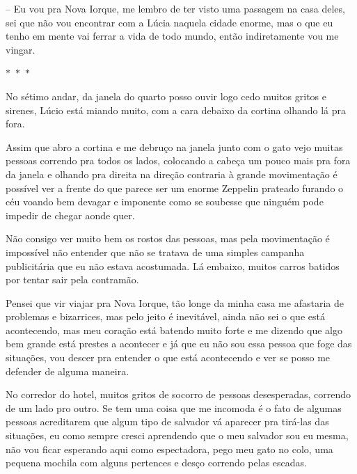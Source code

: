 -- Eu vou pra Nova Iorque, me lembro de ter visto uma passagem na casa deles, sei que não vou encontrar com a Lúcia naquela cidade enorme, mas o que eu tenho em mente vai ferrar a vida de todo mundo, então indiretamente vou me vingar.

\begin{center}
    $\ast$~$\ast$~$\ast$
\end{center}

No sétimo andar, da janela do quarto posso ouvir logo cedo muitos gritos e sirenes, Lúcio está miando muito, com a cara debaixo da cortina olhando lá pra fora.

Assim que abro a cortina e me debruço na janela junto com o gato vejo muitas pessoas correndo pra todos os lados, colocando a cabeça um pouco mais pra fora da janela e olhando pra direita na direção contraria à grande movimentação é possível ver a frente do que parece ser um enorme Zeppelin prateado furando o céu voando bem devagar e imponente como se soubesse que ninguém pode impedir de chegar aonde quer.

Não consigo ver muito bem os rostos das pessoas, mas pela movimentação é impossível não entender que não se tratava de uma simples campanha publicitária que eu não estava acostumada. Lá embaixo, muitos carros batidos por tentar sair pela contramão. 

Pensei que vir viajar pra Nova Iorque, tão longe da minha casa me afastaria de problemas e bizarrices, mas pelo jeito é inevitável, ainda não sei o que está acontecendo, mas meu coração está batendo muito forte e me dizendo que algo bem grande está prestes a acontecer e já que eu não sou essa pessoa que foge das situações, vou descer pra entender o que está acontecendo e ver se posso me defender de alguma maneira.

No corredor do hotel, muitos gritos de socorro de pessoas desesperadas, correndo de um lado pro outro. Se tem uma coisa que me incomoda é o fato de algumas pessoas acreditarem que algum tipo de salvador vá aparecer pra tirá-las das situações, eu como sempre cresci aprendendo que o meu salvador sou eu mesma, não vou ficar esperando aqui como espectadora, pego meu gato no colo, uma pequena mochila com alguns pertences e desço correndo pelas escadas.





